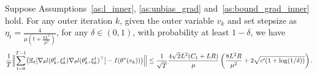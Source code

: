 \documentclass[11 pt]{article}
\begin{document}
\begin{lemma}\label{lemma:thm_Hinv_optimization_error}
Suppose Assumptions~\ref{as:l_inner}, \ref{as:unbias_grad} and~\ref{as:bound_grad_inner} hold. For any outer iteration $k$, given the outer variable $v_k$ and set stepsize as $\displaystyle \eta_t = \frac{4}{\mu\left(t+\frac{8L^2}{\mu^2}\right)}$, for any $\delta \in (0,1)$, with probability at least $1-\delta$, we have
\begin{align*}
\frac{1}{T}\Bigl\|
\sum_{t=0}^{T-1}
\bigl(
\mathbb{E}_t[
\nabla_\theta l(\theta_k^{t},\xi_k^t)\nabla_\theta l(\theta_k^{t},\xi_k^t)^\top]
-
I(\theta^*(v_k))
\bigr)
\Bigr\|  \leq \frac{1}{\sqrt{T}}\frac{4\sqrt2L^2(C_1+LR)}{\mu}\left(\frac{8L^2R}{\mu^2}+2\sqrt{c'(1+\log(1/\delta))}\right).
\end{align*} 
\end{lemma}
\end{document}
